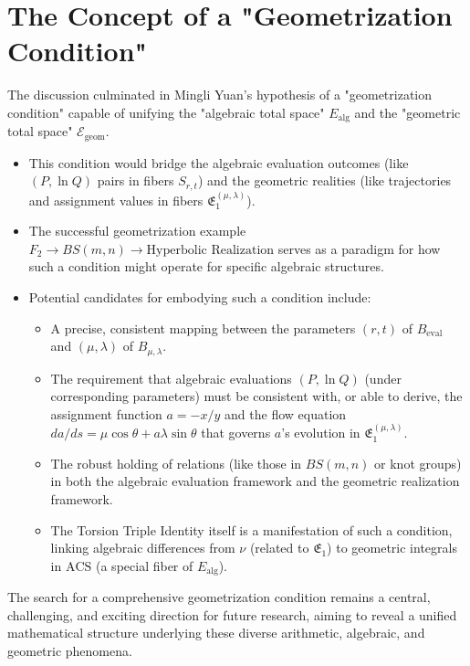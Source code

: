 \documentclass{article}[a4paper,12pt]
\begin{document}
\section{The Concept of a "Geometrization Condition"}
The discussion culminated in Mingli Yuan's hypothesis of a "geometrization condition" capable of unifying the "algebraic total space" $E_{\text{alg}}$ and the "geometric total space" $\mathcal{E}_{\text{geom}}$.
\begin{itemize}
    \item This condition would bridge the algebraic evaluation outcomes (like $(P, \ln Q)$ pairs in fibers $S_{r,t}$) and the geometric realities (like trajectories and assignment values in fibers $\mathfrak{E}_1^{(\mu,\lambda)}$).
    \item The successful geometrization example $F_2 \to BS(m,n) \to \text{Hyperbolic Realization}$ serves as a paradigm for how such a condition might operate for specific algebraic structures.
    \item Potential candidates for embodying such a condition include:
        \begin{itemize}
            \item A precise, consistent mapping between the parameters $(r,t)$ of $B_{\text{eval}}$ and $(\mu,\lambda)$ of $B_{\mu,\lambda}$.
            \item The requirement that algebraic evaluations $(P, \ln Q)$ (under corresponding parameters) must be consistent with, or able to derive, the assignment function $a=-x/y$ and the flow equation $da/ds = \mu \cos\theta + a\lambda \sin\theta$ that governs $a$'s evolution in $\mathfrak{E}_1^{(\mu,\lambda)}$.
            \item The robust holding of relations (like those in $BS(m,n)$ or knot groups) in both the algebraic evaluation framework and the geometric realization framework.
            \item The Torsion Triple Identity itself is a manifestation of such a condition, linking algebraic differences from $\nu$ (related to $\mathfrak{E}_1$) to geometric integrals in $\mathrm{ACS}$ (a special fiber of $E_{\text{alg}}$).
        \end{itemize}
\end{itemize}
The search for a comprehensive geometrization condition remains a central, challenging, and exciting direction for future research, aiming to reveal a unified mathematical structure underlying these diverse arithmetic, algebraic, and geometric phenomena.
\end{document}
